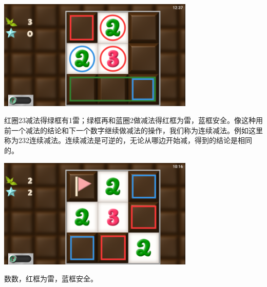 \subsection{} %
\begin{center}
    \includegraphics[width=0.7\textwidth]{puzzle/17-1.png}
\end{center}
红圈23减法得绿框有1雷；绿框再和蓝圈2做减法得红框为雷，蓝框安全。像这种用前一个减法的结论和下一个数字继续做减法的操作，我们称为连续减法。例如这里称为232连续减法。连续减法是可逆的，无论从哪边开始减，得到的结论是相同的。
\begin{center}
    \includegraphics[width=0.7\textwidth]{puzzle/17-2.png}
\end{center}
数数，红框为雷，蓝框安全。

